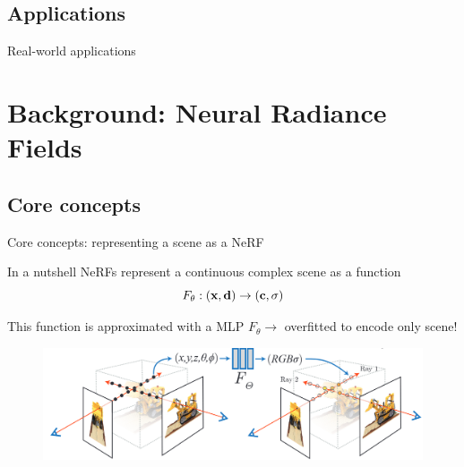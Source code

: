 \documentclass[aspectratio=1610,handout]{beamer}
\begin{document}
\subsection{Applications}
\begin{frame}{Real-world applications}
    
\end{frame}

\section{Background: Neural Radiance Fields}

\subsection{Core concepts}
\begin{frame}{Core concepts: representing a scene as a NeRF}
    \begin{block}{In a nutshell}
        NeRFs represent a continuous complex scene as a function 
        \begin{equation*}
            F_\theta : (\vb{x}, \vb{d}) \rightarrow (\vb{c}, \sigma)
        \end{equation*}
    \end{block}
    This function is approximated with a MLP \(F_\theta \rightarrow\)  overfitted to encode only scene!
    \bigskip
    \begin{figure}[H]
        \centering
        \includegraphics[width=.7\textwidth,keepaspectratio]{mapping}
    \end{figure}
\end{frame}
\end{document}
